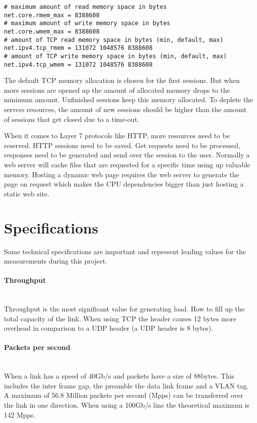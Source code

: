 \newpage

\begin{verbatim}
# maximum amount of read memory space in bytes
net.core.rmem_max = 8388608
# maximum amount of write memory space in bytes
net.core.wmem_max = 8388608
# amount of TCP read memory space in bytes (min, default, max)
net.ipv4.tcp_rmem = 131072 1048576 8388608
# amount of TCP write memory space in bytes (min, default, max)
net.ipv4.tcp_wmem = 131072 1048576 8388608
\end{verbatim}  

The default TCP memory allocation is chosen for the first sessions. But when more sessions are opened up the amount of allocated memory drops to the minimum amount. 
Unfinished sessions keep this memory allocated. To deplete the servers resources, the amount of new sessions should be higher than the amount of sessions that get closed due to a time-out.

When it comes to Layer 7 protocols like HTTP, more resources need to be reserved. HTTP sessions need to be saved. Get requests need to be processed, responses need to be generated and send over the session to the user. Normally a web server will cache files that are requested for a specific time using up valuable memory. 
Hosting a dynamic web page requires the web server to generate the page on request which makes the CPU dependencies bigger than just hosting a static web site. 

\section{Specifications}\label{sec:specifications}
Some technical specifications are important and represent leading values for the measurements during this project. 

\paragraph{Throughput}\label{par:throughput}\mbox{}\\
Throughput is the most significant value for generating load. How to fill up the total capacity of the link. When using TCP the header causes 12 bytes more overhead in comparison to a UDP header (a UDP header is 8 bytes).

\paragraph{Packets per second}\label{par:pps}\mbox{}\\
When a link has a speed of 40Gb/s and packets have a size of 88bytes. This includes the inter frame gap, the preamble the data link frame and a VLAN tag. A maximum of 56.8 Million packets per second (Mpps) can be transferred over the link in one direction. When using a 100Gb/s line the theoretical maximum is 142 Mpps.   

